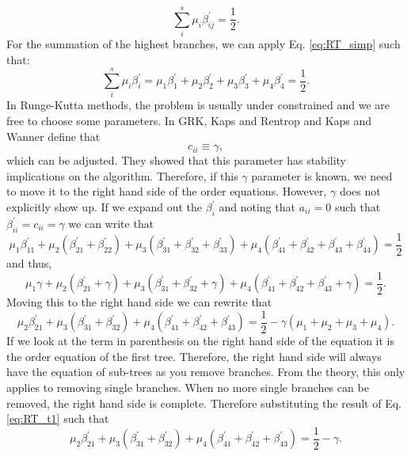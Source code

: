 \documentclass{ansconf}
\numberwithin{equation}{section}
\begin{document}
\begin{equation}
    \sum_i^s \mu_i\beta^\prime_{ij} = \frac{1}{2}. 
\end{equation}
For the summation of the highest branches, we can apply Eq. \eqref{eq:RT_simp} such that:
\begin{equation}
    \sum_i^s \mu_i\beta^\prime_i = \mu_1\beta^\prime_1 + \mu_2\beta^\prime_2 + \mu_3\beta^\prime_3 + \mu_4\beta^\prime_4 = \frac{1}{2}. 
\end{equation}
In Runge-Kutta methods, the problem is usually under constrained and we are free to choose some parameters. In GRK, Kaps and Rentrop and Kaps and Wanner define that
\begin{equation}
    c_{ii} \equiv \gamma ,
\end{equation}
which can be adjusted. They showed that this parameter has stability implications on the algorithm. Therefore, if this $\gamma$ parameter is known, we need to move it to the right hand side of the order equations. However, $\gamma$ does not explicitly show up. If we expand out the $\beta^\prime_i$ and noting that $a_{ii} = 0$ such that $\beta^\prime_{ii} = c_{ii} = \gamma$ we can write that
\begin{equation}
    \mu_1\beta^\prime_{11} + \mu_2\left(\beta^\prime_{21} + \beta^\prime_{22}\right) + \mu_3\left(\beta^\prime_{31} + \beta^\prime_{32} +\beta^\prime_{33} \right) + \mu_4\left(\beta^\prime_{41} + \beta^\prime_{42}+ \beta^\prime_{43} + \beta^\prime_{44}\right) = \frac{1}{2}
\end{equation}
and thus,
\begin{equation}
    \mu_1\gamma + \mu_2\left(\beta^\prime_{21} + \gamma\right) + \mu_3\left(\beta^\prime_{31} + \beta^\prime_{32} +\gamma \right) + \mu_4\left(\beta^\prime_{41} + \beta^\prime_{42}+ \beta^\prime_{43} + \gamma \right) = \frac{1}{2}.
\end{equation}
Moving this to the right hand side we can rewrite that
\begin{equation}
    \mu_2\beta^\prime_{21} + \mu_3\left(\beta^\prime_{31} + \beta^\prime_{32} \right) + \mu_4\left(\beta^\prime_{41} + \beta^\prime_{42}+ \beta^\prime_{43} \right) = \frac{1}{2} - \gamma\left(\mu_1 + \mu_2 + \mu_3 + \mu_4\right).
\end{equation}
If we look at the term in parenthesis on the right hand side of the equation it is the order equation of the first tree. Therefore, the right hand side will always have the equation of sub-trees as you remove branches. From the theory, this only applies to removing single branches. When no more single branches can be removed, the right hand side is complete. Therefore substituting the result of Eq. \eqref{eq:RT_t1} such that
\begin{equation}
    \mu_2\beta^\prime_{21} + \mu_3\left(\beta^\prime_{31} + \beta^\prime_{32} \right) + \mu_4\left(\beta^\prime_{41} + \beta^\prime_{42}+ \beta^\prime_{43} \right) = \frac{1}{2} - \gamma.
\end{equation}
\end{document}
